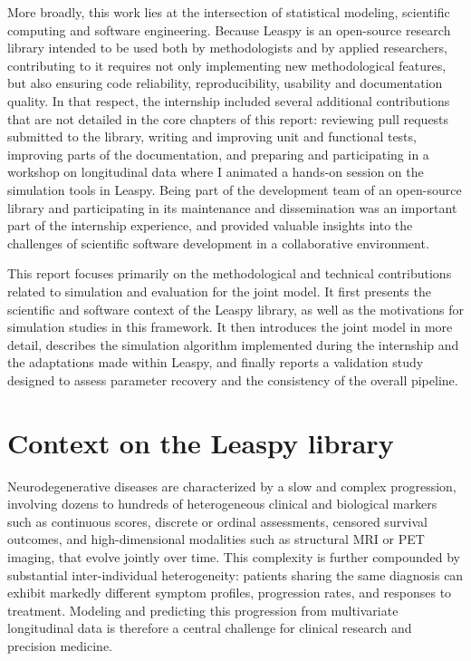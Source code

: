 \documentclass{rapportCS}
\begin{document}
More broadly, this work lies at the intersection of statistical modeling, scientific computing and software engineering. Because Leaspy is an open-source research library intended to be used both by methodologists and by applied researchers, contributing to it requires not only implementing new methodological features, but also ensuring code reliability, reproducibility, usability and documentation quality. In that respect, the internship included several additional contributions that are not detailed in the core chapters of this report: reviewing pull requests submitted to the library, writing and improving unit and functional tests, improving parts of the documentation, and preparing and participating in a workshop on longitudinal data where I animated a hands-on session on the simulation tools in Leaspy. Being part of the development team of an open-source library and participating in its maintenance and dissemination was an important part of the internship experience, and provided valuable insights into the challenges of scientific software development in a collaborative environment.

This report focuses primarily on the methodological and technical contributions related to simulation and evaluation for the joint model. It first presents the scientific and software context of the Leaspy library, as well as the motivations for simulation studies in this framework. It then introduces the joint model in more detail, describes the simulation algorithm implemented during the internship and the adaptations made within Leaspy, and finally reports a validation study designed to assess parameter recovery and the consistency of the overall pipeline.

\newpage


\section{Context on the Leaspy library}

Neurodegenerative diseases are characterized by a slow and complex progression, involving dozens to hundreds of heterogeneous clinical and biological markers such as continuous scores, discrete or ordinal assessments, censored survival outcomes, and high-dimensional modalities such as structural MRI or PET imaging, that evolve jointly over time. This complexity is further compounded by substantial inter-individual heterogeneity: patients sharing the same diagnosis can exhibit markedly different symptom profiles, progression rates, and responses to treatment. Modeling and predicting this progression from multivariate longitudinal data is therefore a central challenge for clinical research and precision medicine.
\end{document}
